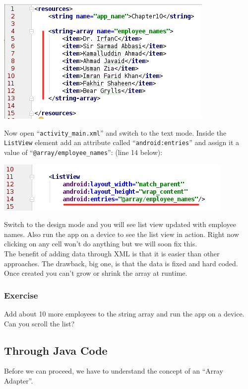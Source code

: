 \begin{center}
	\includegraphics[scale=0.4]{chapters/ch10/images/4}
\end{center}

Now open ``\texttt{activity\_main.xml}'' and switch to the text mode. Inside the \texttt{ListView} element add an attribute called ``\texttt{android:entries}'' and assign it a value of ``\texttt{@array/employee\_names}'': (line 14 below):

\begin{center}
	\includegraphics[scale=0.4]{chapters/ch10/images/5}
\end{center}

Switch to the design mode and you will see list view updated with employee names. Also run the app on a device to see the list view in action. Right now clicking on any cell won't do anything but we will soon fix this. \\

The benefit of adding data through XML is that it is easier than other approaches. The drawback, big one, is that the data is fixed and hard coded. Once created you can't grow or shrink the array at runtime.

\subsubsection{Exercise}
Add about 10 more employees to the string array and run the app on a device. Can you scroll the list?

\subsection{Through Java Code}
Before we can proceed, we have to understand the concept of an ``Array Adapter''. 

